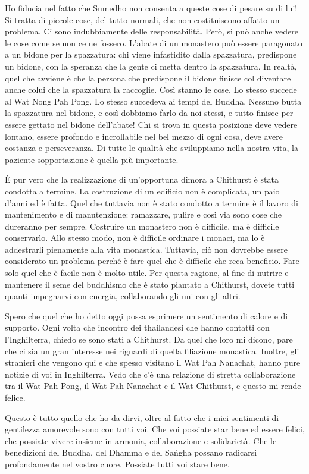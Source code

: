 Ho fiducia nel fatto che Sumedho non consenta a queste cose di pesare su
di lui! Si tratta di piccole cose, del tutto normali, che non
costituiscono affatto un problema. Ci sono indubbiamente delle
responsabilità. Però, si può anche vedere le cose come se non ce ne
fossero. L'abate di un monastero può essere paragonato a un bidone per
la spazzatura: chi viene infastidito dalla spazzatura, predispone un
bidone, con la speranza che la gente ci metta dentro la spazzatura. In
realtà, quel che avviene è che la persona che predispone il bidone
finisce col diventare anche colui che la spazzatura la raccoglie. Così
stanno le cose. Lo stesso succede al Wat Nong Pah Pong. Lo stesso
succedeva ai tempi del Buddha. Nessuno butta la spazzatura nel bidone, e
così dobbiamo farlo da noi stessi, e tutto finisce per essere gettato
nel bidone dell'abate! Chi si trova in questa posizione deve vedere
lontano, essere profondo e incrollabile nel bel mezzo di ogni cosa, deve
avere costanza e perseveranza. Di tutte le qualità che sviluppiamo nella
nostra vita, la paziente sopportazione è quella più importante.

È pur vero che la realizzazione di un'opportuna dimora a Chithurst è
stata condotta a termine. La costruzione di un edificio non è
complicata, un paio d'anni ed è fatta. Quel che tuttavia non è stato
condotto a termine è il lavoro di mantenimento e di manutenzione:
ramazzare, pulire e così via sono cose che dureranno per sempre.
Costruire un monastero non è difficile, ma è difficile conservarlo. Allo
stesso modo, non è difficile ordinare i monaci, ma lo è addestrarli
pienamente alla vita monastica. Tuttavia, ciò non dovrebbe essere
considerato un problema perché è fare quel che è difficile che reca
beneficio. Fare solo quel che è facile non è molto utile. Per questa
ragione, al fine di nutrire e mantenere il seme del buddhismo che è
stato piantato a Chithurst, dovete tutti quanti impegnarvi con energia,
collaborando gli uni con gli altri.

Spero che quel che ho detto oggi possa esprimere un sentimento di calore
e di supporto. Ogni volta che incontro dei thailandesi che hanno
contatti con l'Inghilterra, chiedo se sono stati a Chithurst. Da quel
che loro mi dicono, pare che ci sia un gran interesse nei riguardi di
quella filiazione monastica. Inoltre, gli stranieri che vengono qui e
che spesso visitano il Wat Pah Nanachat, hanno pure notizie di voi in
Inghilterra. Vedo che c'è una relazione di stretta collaborazione tra il
Wat Pah Pong, il Wat Pah Nanachat e il Wat Chithurst, e questo mi rende
felice.

Questo è tutto quello che ho da dirvi, oltre al fatto che i miei
sentimenti di gentilezza amorevole sono con tutti voi. Che voi possiate
star bene ed essere felici, che possiate vivere insieme in armonia,
collaborazione e solidarietà. Che le benedizioni del Buddha, del Dhamma
e del Saṅgha possano radicarsi profondamente nel vostro cuore. Possiate
tutti voi stare bene.

